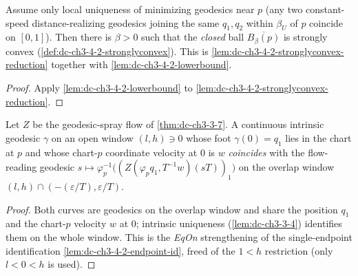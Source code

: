 \begin{lemma}
  \label{lem:dc-ch3-4-2-stronglyconvex-uniq}
  \leanok
  Assume only local uniqueness of minimizing geodesics near $p$ (any two
  constant-speed distance-realizing geodesics joining the same $q_1,q_2$ within $\beta_U$ of $p$
  coincide on $[0,1]$). Then there is $\beta>0$ such that the \emph{closed} ball
  $\overline{B_\beta(p)}$ is strongly convex (\cref{def:dc-ch3-4-2-stronglyconvex}). This is
  \cref{lem:dc-ch3-4-2-stronglyconvex-reduction} together with
  \cref{lem:dc-ch3-4-2-lowerbound}.
\end{lemma}
\begin{proof}
  \sketch
  \leanok
  Apply \cref{lem:dc-ch3-4-2-lowerbound} to
  \cref{lem:dc-ch3-4-2-stronglyconvex-reduction}.
\end{proof}

\begin{lemma}
  \label{lem:dc-ch3-4-2-eqon-flow-reading}
  \leanok
  Let $Z$ be the geodesic-spray flow of \cref{thm:dc-ch3-3-7}. A continuous intrinsic geodesic
  $\gamma$ on an open window $(l,h)\ni0$ whose foot $\gamma(0)=q_1$ lies in the chart at $p$ and whose
  chart-$p$ coordinate velocity at $0$ is $w$ \emph{coincides} with the flow-reading geodesic
  $s\mapsto\varphi_p^{-1}\bigl((Z(\varphi_p q_1,T^{-1}w)(sT))_1\bigr)$ on the overlap window
  $(l,h)\cap(-(\varepsilon/T),\varepsilon/T)$.
\end{lemma}
\begin{proof}
  \sketch
  \leanok
  Both curves are geodesics on the overlap window and share the position $q_1$ and the chart-$p$
  velocity $w$ at $0$; intrinsic uniqueness (\cref{lem:dc-ch3-3-4}) identifies them on the whole
  window. This is the \emph{EqOn} strengthening of the single-endpoint identification
  \cref{lem:dc-ch3-4-2-endpoint-id}, freed of the $1<h$ restriction (only $l<0<h$ is used).
\end{proof}

